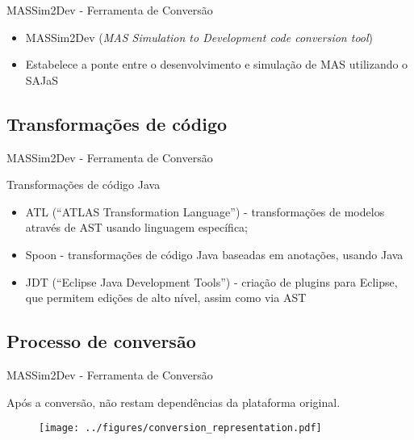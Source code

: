 
\begin{frame}{MASSim2Dev - Ferramenta de Conversão}

	\begin{itemize}
	\item MASSim2Dev (\emph{MAS Simulation to Development code conversion tool})
	\item Estabelece a ponte entre o desenvolvimento e simulação de MAS utilizando o SAJaS
	\end{itemize}
\end{frame}

\subsection{Transformações de código}
\begin{frame}{MASSim2Dev - Ferramenta de Conversão}

	Transformações de código Java

	\begin{itemize}
	\item ATL (``ATLAS Transformation Language'') - transformações de modelos através de AST usando linguagem específica;
	\item Spoon - transformações de código Java baseadas em anotações, usando Java
	\item JDT (``Eclipse Java Development Tools'') - criação de plugins para Eclipse, que permitem edições de alto nível, assim como via AST

	\end{itemize}
\end{frame}

\subsection{Processo de conversão}
\begin{frame}{MASSim2Dev - Ferramenta de Conversão}

	Após a conversão, não restam dependências da plataforma original.
	\begin{figure}[h]
	\centering
	\texttt{[image: ../figures/conversion\_representation.pdf]}
\end{figure}
	
\end{frame}